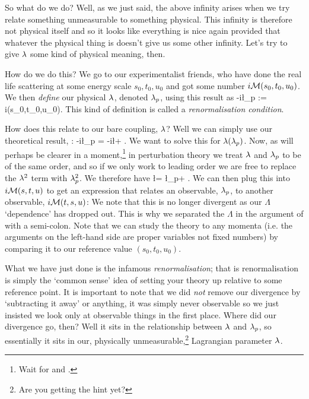 So what do we do? Well, as we just said, the above infinity arises when we try relate something unmeasurable to something physical. This infinity is therefore not physical itself and so it looks like everything is nice again provided that whatever the physical thing is doesn't give us some other infinity. Let's try to give $\lambda$ some kind of physical meaning, then. 

How do we do this? We go to our experimentalist friends, who have done the real life scattering at some energy scale $s_0,t_0,u_0$ and got some number $i\mathcal{M}(s_0,t_0,u_0)$. We then \textit{define} our physical $\lambda$, denoted $\lambda_p$, using this result as
\be 
\label{eqn:LambdaPhysical}
    -i\l_p := i\cM(s_0,t_0,u_0). 
\ee 
This kind of definition is called a \textit{renormalisation condition}.

How does this relate to our bare coupling, $\lambda$? Well we can simply use our theoretical result, :
\bse 
    -i\l_p = -i\l +  .
\ese 
We want to solve this for $\lambda(\lambda_p)$. Now, as will perhaps be clearer in a moment,\footnote{Wait for  and .} in perturbation theory we treat $\lambda$ and $\lambda_p$ to be of the same order, and so if we only work to leading order we are free to replace the $\lambda^2$ term with $\lambda_p^2$. We therefore have
\bse 
    \l = \l_p+  .
\ese 
We can then plug this into $i\mathcal{M}(s,t,u)$ to get an expression that relates an observable, $\lambda_p$, to another observable, $i\mathcal{M}(t,s,u)$:
\noindent We note that this is no longer divergent as our $\Lambda$ `dependence' has dropped out. This is why we separated the $\Lambda$ in the argument of  with a semi-colon. Note that we can study the theory to any momenta (i.e. the arguments on the left-hand side are proper variables not fixed numbers) by comparing it to our reference value $(s_0,t_0,u_0)$.

What we have just done is the infamous \textit{renormalisation}; that is renormalisation is simply the `common sense' idea of setting your theory up relative to some reference point. It is important to note that we did \textit{not} remove our divergence by `subtracting it away' or anything, it was simply never observable so we just insisted we look only at observable things in the first place. Where did our divergence go, then? Well it sits in the relationship between $\lambda$ and $\lambda_p$, so essentially it sits in our, physically unmeasurable,\footnote{Are you getting the hint yet?} Lagrangian parameter $\lambda$. 


